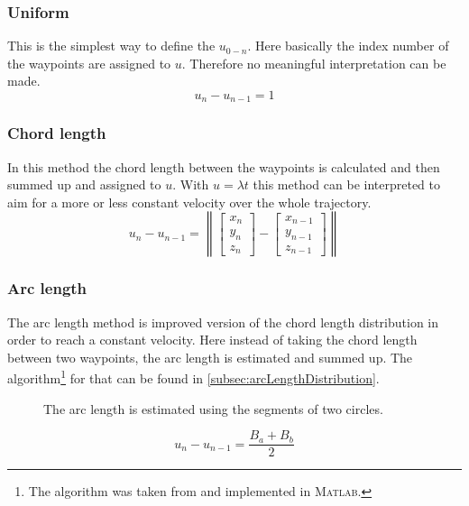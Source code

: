 \subsubsection{Uniform}
This is the simplest way to define the $u_{0-n}$. Here basically the index number of the waypoints are assigned to $u$. Therefore no meaningful interpretation can be made.
\begin{equation*}
u_n-u_{n-1}=1
\end{equation*}
\subsubsection{Chord length}
In this method the chord length between the waypoints is calculated and then summed up and assigned to $u$. With $u=\lambda t$ this method can be interpreted to aim for a more or less constant velocity over the whole trajectory.
\begin{equation*}
u_n-u_{n-1}=\left \| \begin{bmatrix}x_n\\y_n\\z_n \end{bmatrix}-\begin{bmatrix}x_{n-1}\\y_{n-1}\\z_{n-1} \end{bmatrix}\right \|
\end{equation*}
\subsubsection{Arc length}
The arc length method is improved version of the chord length distribution in order to reach a constant velocity. Here instead of taking the chord length between two waypoints, the arc length is estimated and summed up. The algorithm\footnote{The algorithm was taken from \cite{engeln} and implemented in \textsc{Matlab}.} for that can be found in \ref{subsec:arcLengthDistribution}.

\begin{figure}[h]
\centering
\def\svgwidth{0.7\textwidth}

\caption{The arc length is estimated using the segments of two circles.}
\label{fig:arcLength}
\end{figure}

\begin{equation*}
u_n-u_{n-1}=\frac{B_a+B_b}{2}
\end{equation*}

